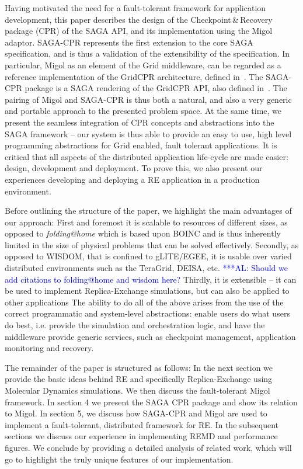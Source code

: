 \documentclass[times, 10pt, twocolumn]{article}
\newcommand{\alnote}[1]{ {\textcolor{blue} { ***AL: #1 }}}
\newcommand{\jhanote}[1]{ {\textcolor{red} { ***SJ: #1 }}}
\newcommand{\alnote}[1]{}
\newcommand{\jhanote}[1]{}
\begin{document}
Having motivated the need for a fault-tolerant framework for
application development, this paper describes the design of the
Checkpoint\,\&\,Recovery package (CPR) of the SAGA API, and its
implementation using the Migol adaptor. SAGA-CPR represents the first
extension to the core SAGA specification, and is thus a validation of
the extensibility of the specification.  In particular, Migol as an
element of the Grid middleware, can be regarded as a reference
implementation of the GridCPR architecture, defined
in~\cite{ogf_cpr_arch}.  The SAGA-CPR package is a SAGA rendering of
the GridCPR API, also defined in~\cite{ogf_cpr_arch}.  The pairing of
Migol and SAGA-CPR is thus both a natural, and also a very generic and
portable approach to the presented problem space.  At the same time,
we present the seamless integration of CPR concepts and abstractions
into the SAGA framework -- our system is thus able to provide an easy to
use, high level programming abstractions for Grid enabled, fault
tolerant applications.  It is critical that all aspects of the
distributed application life-cycle are made easier: design, development
and deployment. To prove this, we also present our experiences developing
and deploying a RE application in a production environment.

Before outlining the structure of the paper, we highlight the main
advantages of our approach: First and foremost it is scalable to
resources of different sizes, as opposed to {\it folding@home}
which is based upon BOINC and is thus inherently limited in the size of
physical problems that can be solved effectively. Secondly, as opposed
to WISDOM, that is confined to gLITE/EGEE, it is usable over varied
distributed environments such as the TeraGrid, DEISA, etc.
\alnote{Should we add citations to folding@home and wisdom here?} 
Thirdly, it is extensible -- it can be used to implement Replica-Exchange simulations, 
but can also be applied to other applications
The ability to do all of the above arises from the use of the
correct programmatic and system-level abstractions: enable users do
what users do best,%
i.e. provide the simulation and orchestration logic, and 
have the middleware provide generic services,
such as checkpoint management, application monitoring and recovery.

The remainder of the paper is structured as follows: In the next
section we provide the basic ideas behind RE and specifically
Replica-Exchange using Molecular Dynamics simulations.  We then
discuss the fault-tolerant Migol framework. In section 4 we present
the SAGA CPR package and show its relation to Migol. In section 5,
we discuss how SAGA-CPR and Migol are used to implement a
fault-tolerant, distributed framework for RE. In the subsequent sections
we discuss our experience in implementing REMD and performance
figures. We conclude by providing a detailed analysis of related work,
which will go to highlight the truly unique features of our
implementation.
\end{document}
